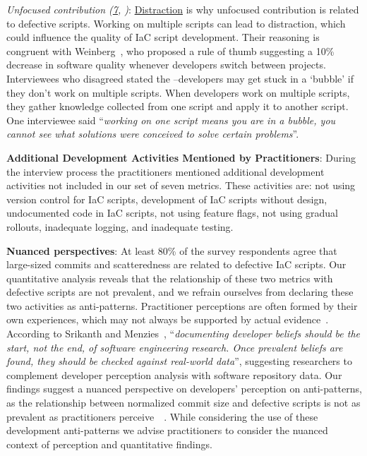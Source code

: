 \documentclass[smallextended]{svjour3}       %
\begin{document}
\textit{Unfocused contribution (\ul{7}, )}: \ul{Distraction} is why unfocused contribution is related to defective scripts. Working on multiple scripts can lead to distraction, which could influence the quality of IaC script development. Their reasoning is congruent with Weinberg~\citep{Weinberg:1992:QSM}, who proposed a rule of thumb suggesting a 10\% decrease in software quality whenever developers switch between projects. Interviewees who disagreed stated the --developers may get stuck in a `bubble' if they don't work on multiple scripts. When developers work on multiple scripts, they gather knowledge collected from one script and apply it to another script. One interviewee said ``\textit{working on one script means you are in a bubble, you cannot see what solutions were conceived to solve certain problems}''.    

\textbf{Additional Development Activities Mentioned by Practitioners}: During the interview process the practitioners mentioned additional development activities not included in our set of seven metrics. These activities are: not using version control for IaC scripts, development of IaC scripts without design, undocumented code in IaC scripts, not using feature flags, not using gradual rollouts, inadequate logging, and inadequate testing. 

\textbf{Nuanced perspectives}: At least 80\% of the survey respondents agree that large-sized commits and scatteredness are related to defective IaC scripts. Our quantitative analysis reveals that the relationship of these two metrics with defective scripts are not prevalent, and we refrain ourselves from declaring these two activities as anti-patterns. Practitioner perceptions are often formed by their own experiences, which may not always be supported by actual evidence~\citep{Devanbu:Belief:Evidence}. According to Srikanth and Menzies~\citep{Srikanth:Menzies:TSE2019:DevBeliefs}, ``\textit{documenting developer beliefs should be the start, not the end, of software engineering research. Once prevalent beliefs are found, they should be checked against real-world data}'', suggesting researchers to complement developer perception analysis with software repository data. Our findings suggest a nuanced perspective on developers' perception on anti-patterns, as the relationship between normalized commit size and defective scripts is not as prevalent as practitioners perceive~\citep{kief:iac:book}~\citep{dzone:small:commits}. While considering the use of these development anti-patterns we advise practitioners to consider the nuanced context of perception and quantitative findings.  
\end{document}
